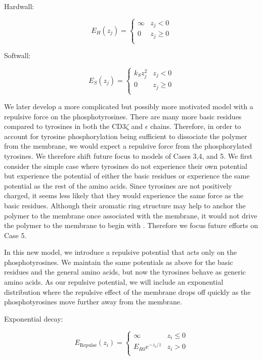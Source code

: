 \documentclass[../../AdvancementSummary.tex]{subfiles}
\begin{document}
Hardwall:

\begin{equation}\label{eq: hardwall}
E_H(z_j) = 
\begin{cases}
\infty 	& z_j < 0\\
0 & z_j \geq 0 \\
\end{cases}
\end{equation}


Softwall:

\begin{equation}\label{eq: softwall}
E_S(z_j) = 
\begin{cases}
k_Sz_j^2 	& z_j < 0\\
0 & z_j \geq 0 \\
\end{cases}
\end{equation}

We later develop a more complicated but possibly more motivated model with a repulsive force on the phosphotyrosines. There are many more basic residues compared to tyrosines in both the CD3$\zeta$ and $\epsilon$ chains. Therefore, in order to account for tyrosine phosphorylation being sufficient to dissociate the polymer from the membrane, we would expect a repulsive force from the phosphorylated tyrosines. We therefore shift future focus to models of Cases 3,4, and 5. We first consider the simple case where tyrosines do not experience their own potential but experience the potential of either the basic residues or experience the same potential as the rest of the amino acids. Since tyrosines are not positively charged, it seems less likely that they would experience the same force as the basic residues. Although their aromatic ring structure may help to anchor the polymer to the membrane once associated with the membrane, it would not drive the polymer to the membrane to begin with \cite{Lopez2015}. Therefore we focus future efforts on Case 5.

In this new model, we introduce a repulsive potential that acts only on the phosphotyrosines. We maintain the same potentials as above for the basic residues and the general amino acids, but now the tyrosines behave as generic amino acids. As our repulsive potential, we will include an exponential distribution where the repulsive effect of the membrane drops off quickly as the phosphotyrosines move further away from the membrane.

Exponential decay:

\begin{equation}\label{eq: exponential}
E_{\text{Repulse}}(z_i) = 
\begin{cases}
\infty	& z_i \leq 0\\
E_{R0}e^{-z_i/\bar{z}} & z_i > 0 \\
\end{cases}
\end{equation}
\end{document}
